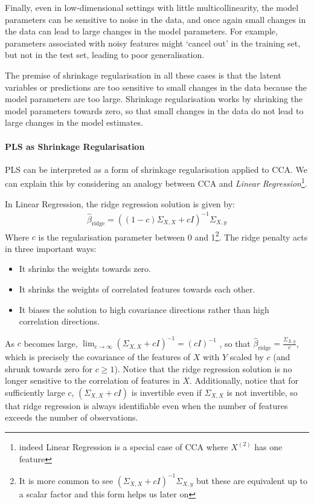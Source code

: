 Finally, even in low-dimensional settings with little multicollinearity, the model parameters can be sensitive to noise in the data, and once again small changes in the data can lead to large changes in the model parameters.
For example, parameters associated with noisy features might `cancel out' in the training set, but not in the test set, leading to poor generalisation.

The premise of shrinkage regularisation in all these cases is that the latent variables or predictions are too sensitive to small changes in the data because the model parameters are too large.
Shrinkage regularisation works by shrinking the model parameters towards zero, so that small changes in the data do not lead to large changes in the model estimates.

\paragraph{PLS as Shrinkage Regularisation} PLS can be interpreted as a form of shrinkage regularisation applied to CCA. We can explain this by considering an analogy between CCA and \textit{Linear Regression}\footnote{indeed Linear Regression is a special case of CCA where \(X^{(2)}\) has one feature}.

In Linear Regression, the ridge regression solution is given by:
\begin{align}
    \hat{\beta}_{\text{ridge}} = ((1-c)\Sigma_{X,X} + c I)^{-1} \Sigma_{X,y}
\end{align}
Where \(c\) is the regularisation parameter between 0 and 1\footnote{It is more common to see $(\Sigma_{X,X} + c I)^{-1} \Sigma_{X,y}$ but these are equivalent up to a scalar factor and this form helps us later on}.
The ridge penalty acts in three important ways:
\begin{itemize}
    \item It shrinks the \gls{weights} towards zero.
    \item It shrinks the \gls{weights} of correlated features towards each other.
    \item It biases the solution to high covariance directions rather than high correlation directions.
\end{itemize}

As $c$ becomes large, $\lim_{c \to \infty} (\Sigma_{X,X} + c I)^{-1} = (c I)^{-1}$
, so that $\hat{\beta}_{\text{ridge}}=\frac{\Sigma_{X,y}}{c}$, which is precisely the covariance of the features of $X$ with $Y$ scaled by $c$ (and shrunk towards zero for $c \geq 1$).
Notice that the ridge regression solution is no longer sensitive to the correlation of features in $X$.
Additionally, notice that for sufficiently large $c$, $(\Sigma_{X,X} + c I)$ is invertible even if $\Sigma_{X,X}$ is not invertible, so that ridge regression is always identifiable even when the number of features exceeds the number of observations.

